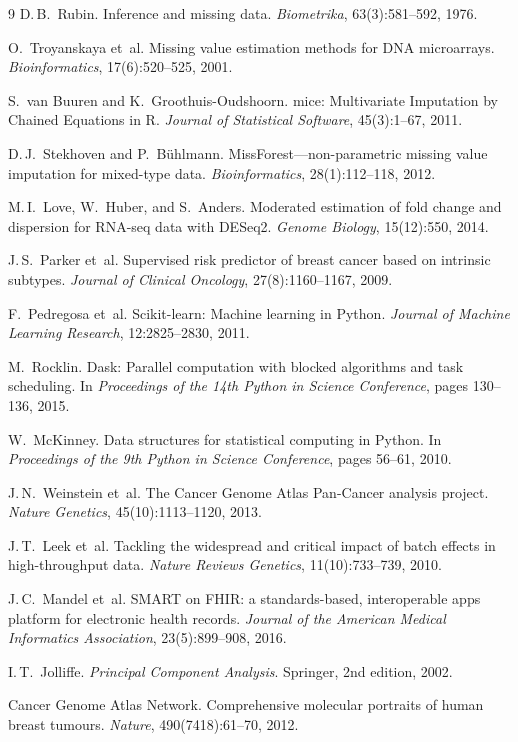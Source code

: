 \documentclass[sigconf,nonacm]{acmart}
\begin{document}
\begin{thebibliography}{9}
D.\,B.~Rubin.
\newblock Inference and missing data.
\newblock \emph{Biometrika}, 63(3):581--592, 1976.

O.~Troyanskaya et~al.
\newblock Missing value estimation methods for DNA microarrays.
\newblock \emph{Bioinformatics}, 17(6):520--525, 2001.

S.~van Buuren and K.~Groothuis-Oudshoorn.
\newblock mice: Multivariate Imputation by Chained Equations in R.
\newblock \emph{Journal of Statistical Software}, 45(3):1--67, 2011.

D.\,J.~Stekhoven and P.~Bühlmann.
\newblock MissForest---non-parametric missing value imputation for mixed-type data.
\newblock \emph{Bioinformatics}, 28(1):112--118, 2012.

M.\,I.~Love, W.~Huber, and S.~Anders.
\newblock Moderated estimation of fold change and dispersion for RNA-seq data with DESeq2.
\newblock \emph{Genome Biology}, 15(12):550, 2014.

J.\,S.~Parker et~al.
\newblock Supervised risk predictor of breast cancer based on intrinsic subtypes.
\newblock \emph{Journal of Clinical Oncology}, 27(8):1160--1167, 2009.

F.~Pedregosa et~al.
\newblock Scikit-learn: Machine learning in Python.
\newblock \emph{Journal of Machine Learning Research}, 12:2825--2830, 2011.

M.~Rocklin.
\newblock Dask: Parallel computation with blocked algorithms and task scheduling.
\newblock In \emph{Proceedings of the 14th Python in Science Conference}, pages 130--136, 2015.

W.~McKinney.
\newblock Data structures for statistical computing in Python.
\newblock In \emph{Proceedings of the 9th Python in Science Conference}, pages 56--61, 2010.

J.\,N.~Weinstein et~al.
\newblock The Cancer Genome Atlas Pan-Cancer analysis project.
\newblock \emph{Nature Genetics}, 45(10):1113--1120, 2013.

J.\,T.~Leek et~al.
\newblock Tackling the widespread and critical impact of batch effects in high-throughput data.
\newblock \emph{Nature Reviews Genetics}, 11(10):733--739, 2010.

J.\,C.~Mandel et~al.
\newblock SMART on FHIR: a standards-based, interoperable apps platform for electronic health records.
\newblock \emph{Journal of the American Medical Informatics Association}, 23(5):899--908, 2016.

I.\,T.~Jolliffe.
\newblock \emph{Principal Component Analysis}.
\newblock Springer, 2nd edition, 2002.

Cancer Genome Atlas Network.
\newblock Comprehensive molecular portraits of human breast tumours.
\newblock \emph{Nature}, 490(7418):61--70, 2012.

\end{thebibliography}
\end{document}
